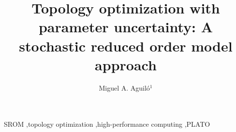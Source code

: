 \documentclass[preprint]{elsarticle} 	%
\begin{document}
\title{Topology optimization with parameter uncertainty: A stochastic reduced order model approach}

\author{Miguel A. Aguil\'o$^1$}

\address{$^1$ Sandia National Laboratories, 1515 Eubank SE, Albuquerque, NM 87123}
 


\begin{keyword}
SROM \sep topology optimization \sep high-performance computing \sep PLATO
\end{keyword}

\maketitle


 

 

 

 

 




 
\end{document}
